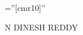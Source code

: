 \documentclass[a4paper,10pt]{article}
\begin{document}

\pagestyle{empty} %

\font\fb=''[cmr10]'' %

\par{\centering
		{\Huge N DINESH \textsc{REDDY}
	}\bigskip\par}
%
\end{document}
